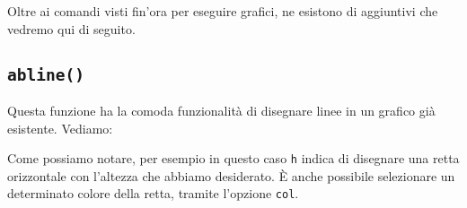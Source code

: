 Oltre ai comandi visti fin'ora per eseguire grafici, ne esistono di aggiuntivi
che vedremo qui di seguito.

\subsection{\texttt{abline()}}

Questa funzione ha la comoda funzionalità di disegnare linee in un grafico già
esistente. Vediamo:



Come possiamo notare, per esempio in questo caso \texttt{h} indica di disegnare
una retta orizzontale con l'altezza che abbiamo desiderato.
È anche possibile selezionare un determinato colore della retta, tramite
l'opzione \texttt{col}.

